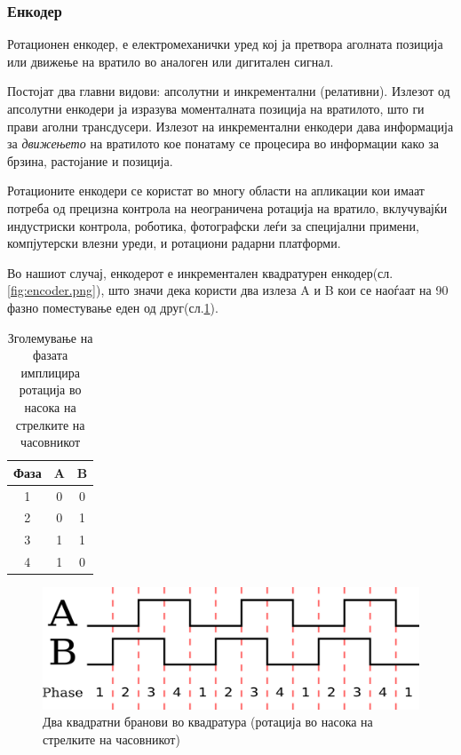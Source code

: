 \documentclass[12pt]{article}
\begin{document}
    \subsubsection{Енкодер}
      Ротационен енкодер, е електромеханички уред кој ја претвора аголната позиција или движење на вратило во аналоген или дигитален сигнал.

		  Постојат два главни видови: апсолутни и инкрементални (релативни). Излезот од апсолутни енкодери ја изразува моменталната позиција на вратилото, што ги прави аголни трансдусери. Излезот на инкрементални енкодери дава информација за \textit{движењето} на вратилото кое понатаму се процесира во информации како за брзина, растојание и позиција.

		  Ротационите енкодери се користат во многу области на апликации кои имаат потреба од прецизна контрола на неограничена ротација на вратило, вклучувајќи индустриски контрола, роботика, фотографски леѓи за специјални примени, компјутерски влезни уреди, и ротациони радарни платформи.

		  Во нашиот случај, енкодерот е инкрементален квадратурен енкодер(сл.\ref{fig:encoder.png}), што значи дека користи два излеза A и B кои се наоѓаат на 90 \degree фазно поместување еден од друг(сл.\ref{fig:encoder_quadrature.png}).

		  \begin{table}[h]
        \caption{Зголемување на фазата имплицира ротација во насока на стрелките на часовникот}
        \label{tab:fazno}
        \begin{center}
          \begin{tabular}{||c|c|c||}
            \hline
            Фаза & A & B \\
            \hline \hline
            1 & 0 & 0 \\
            \hline
					  2 & 0 & 1 \\
            \hline
            3 & 1 & 1 \\
            \hline
            4 & 1 & 0 \\
            \hline
            \end{tabular}
          \end{center}
        \end{table}

      \begin{figure}[H]
        \includegraphics[width=0.5\linewidth]{./images/encoder_quadrature.png}
        \centering
        \caption{Два квадратни бранови во квадратура (ротација во насока на стрелките на часовникот)}
        \label{fig:encoder_quadrature.png}
        \end{figure}
\end{document}
